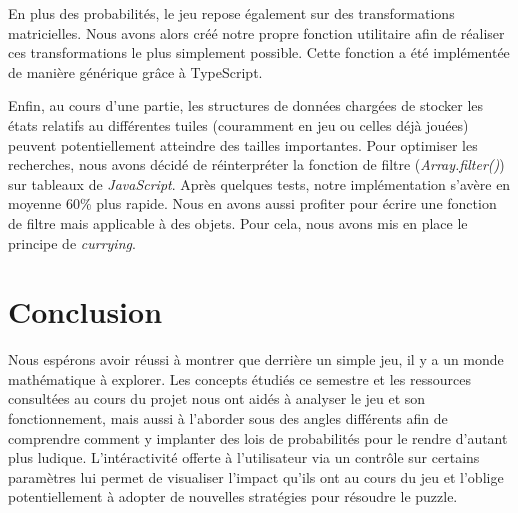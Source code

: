 \documentclass[a4paper, 12pt]{report}
\begin{document}
\vspace{0.5cm}

\tabto{1cm} En plus des probabilités, le jeu repose également sur des transformations
matricielles. Nous avons alors créé notre propre fonction utilitaire afin de réaliser ces transformations le plus
simplement possible. Cette fonction a été implémentée de manière générique grâce à TypeScript.

\vspace{0.5cm}

\tabto{1cm} Enfin, au cours d'une partie, les structures de données chargées de stocker les états relatifs au différentes tuiles
(couramment en jeu ou celles déjà jouées) peuvent potentiellement atteindre des tailles importantes. Pour optimiser les recherches, 
nous avons décidé de réinterpréter la fonction de filtre (\textit{Array.filter()}) sur tableaux de \textit{JavaScript}.
Après quelques tests, notre implémentation s'avère en moyenne 60\% plus rapide. Nous en avons aussi profiter pour écrire une fonction
de filtre mais applicable à des objets. Pour cela, nous avons mis en place le principe de \textit{currying}.

\chapter{Conclusion}

\tabto{1cm}Nous espérons avoir réussi à montrer que derrière un simple jeu, il y a un monde
mathématique à explorer. Les concepts étudiés ce semestre et les ressources consultées au
cours du projet nous ont aidés à analyser le jeu et son fonctionnement, mais aussi à l'aborder
sous des angles différents afin de comprendre comment y implanter des lois de probabilités
pour le rendre d'autant plus ludique. L'intéractivité offerte à l'utilisateur via un contrôle
sur certains paramètres lui permet de visualiser l'impact qu'ils ont au cours du jeu et l'oblige 
potentiellement à adopter de nouvelles stratégies pour résoudre le puzzle.
\end{document}
